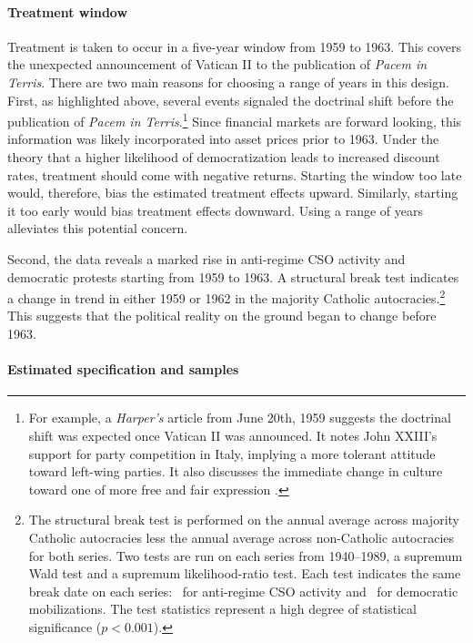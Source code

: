 \documentclass[12pt]{article}
\numberwithin{equation}{section}
\begin{document}
\paragraph{Treatment window} 
Treatment is taken to occur in a five-year window from 1959 to 1963. This covers the unexpected announcement of Vatican II to the publication of \textit{Pacem in Terris}. There are two main reasons for choosing a range of years in this design. First, as highlighted above, several events signaled the doctrinal shift before the publication of \textit{Pacem in Terris}.\footnote{For example, a \textit{Harper's} article from June 20th, 1959 suggests the doctrinal shift was expected once Vatican II was announced. It notes John XXIII's support for party competition in Italy, implying a more tolerant attitude toward left-wing parties. It also discusses the immediate change in culture toward one of more free and fair expression \citep{Neville1959}.}
 Since financial markets are forward looking, this information was likely incorporated into asset prices prior to 1963. Under the theory that a higher likelihood of democratization leads to increased discount rates, treatment should come with negative returns. Starting the window too late would, therefore, bias the estimated treatment effects upward. Similarly, starting it too early would bias treatment effects downward. Using a range of years alleviates this potential concern.

Second, the data reveals a marked rise in anti-regime CSO activity and democratic protests starting from 1959 to 1963. A structural break test indicates a change in trend in either 1959 or 1962 in the majority Catholic autocracies.\footnote{The structural break test is performed on the annual average across majority Catholic autocracies less the annual average across non-Catholic autocracies for both series. Two tests are run on each series from 1940--1989, a supremum Wald test and a supremum likelihood-ratio test. Each test indicates the same break date on each series: \figFiveBreakCSO\ for anti-regime CSO activity and \figFiveBreakMob\ for democratic mobilizations. The test statistics represent a high degree of statistical significance ($p<0.001$).} This suggests that the political reality on the ground began to change before 1963.

\paragraph{Estimated specification and samples}
\end{document}
